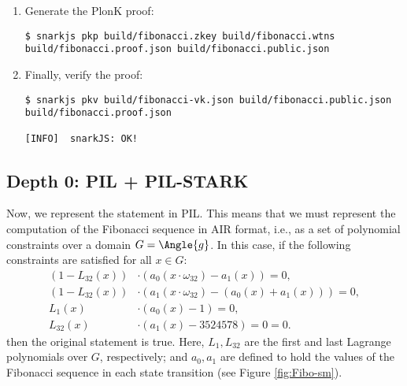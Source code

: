 \begin{enumerate}
\begin{lstlisting}[style=termt]
[INFO]  snarkJS: EXPORT VERIFICATION KEY STARTED
[INFO]  snarkJS: > Detected protocol: plonk
[INFO]  snarkJS: EXPORT VERIFICATION KEY FINISHED
\end{lstlisting}

\item Generate the PlonK proof:
\begin{lstlisting}[style=termt]
$ snarkjs pkp build/fibonacci.zkey build/fibonacci.wtns build/fibonacci.proof.json build/fibonacci.public.json
\end{lstlisting}

\item Finally, verify the proof:
\begin{lstlisting}[style=termt]
$ snarkjs pkv build/fibonacci-vk.json build/fibonacci.public.json build/fibonacci.proof.json

[INFO]  snarkJS: OK!
\end{lstlisting}
\end{enumerate}





\subsection{Depth 0: PIL + PIL-STARK}

Now, we represent the statement in PIL. This means that we must represent the computation of the Fibonacci sequence in AIR format, i.e., as a set of polynomial constraints over a domain $G = \Angle{g}$. In this case, if the following constraints are satisfied for all $x \in G$:
\begin{align*}
(1 - L_{32}(x)) &\cdot (a_0(x \cdot \omega_{32}) - a_1(x)) = 0, \\
(1 - L_{32}(x)) &\cdot (a_1(x \cdot \omega_{32}) - (a_0(x) + a_1(x))) = 0, \\
L_1(x) &\cdot (a_0(x) - 1) = 0, \\
L_{32}(x) &\cdot (a_1(x) - 3524578) = 0 = 0.
\end{align*}
then the original statement is true. Here, $L_1,L_{32}$ are the first and last Lagrange polynomials over $G$, respectively; and $a_0,a_1$ are defined to hold the values of the Fibonacci sequence in each state transition (see Figure \ref{fig:Fibo-sm}).

